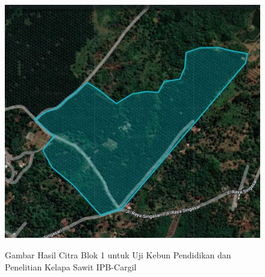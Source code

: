\begin{figure}[H]
	\vspace{-0.1cm}
	\begin{center}
		\includegraphics[width=1\columnwidth]{lampiran/Picture2.jpg}
	\end{center}
	\vspace{-0.2cm}
	\captionsetup{justification=centering}
	Gambar Hasil Citra Blok 1 untuk Uji Kebun Pendidikan dan Penelitian Kelapa Sawit IPB-Cargil
\end{figure}

